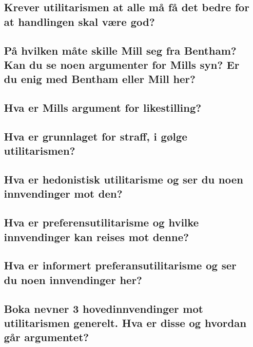 \documentclass[11pt]{article}
\begin{document}
\subsection{Krever utilitarismen at alle må få det bedre for at handlingen skal være god?}

\subsection{På hvilken måte skille Mill seg fra Bentham? Kan du se noen argumenter for Mills syn? Er du enig med Bentham eller Mill her?}

\subsection{Hva er Mills argument for likestilling?}

\subsection{Hva er grunnlaget for straff, i gølge utilitarismen?}

\subsection{Hva er hedonistisk utilitarisme og ser du noen innvendinger mot den?}

\subsection{Hva er preferensutilitarisme og hvilke innvendinger kan reises mot denne?}

\subsection{Hva er informert preferansutilitarisme og ser du noen innvendinger her?}

\subsection{Boka nevner 3 hovedinnvendinger mot utilitarismen generelt. Hva er disse og hvordan går argumentet?}
\end{document}
